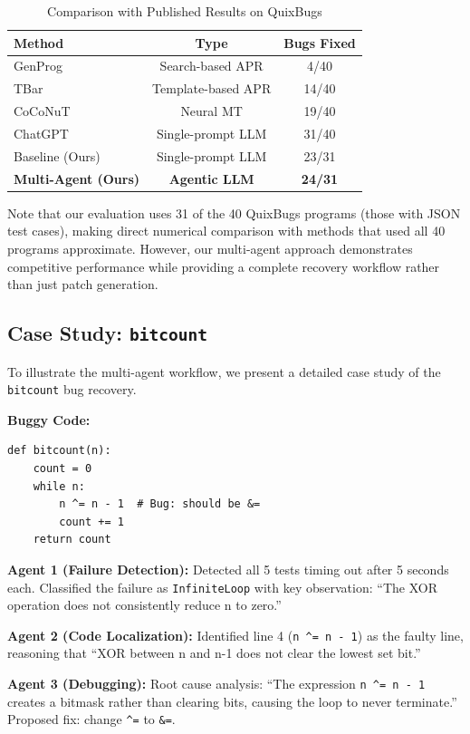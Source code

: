 \documentclass[conference]{IEEEtran}
\begin{document}
\begin{table}[htbp]
\caption{Comparison with Published Results on QuixBugs}
\label{tab:litresults}
\centering
\begin{tabular}{lcc}
\toprule
\textbf{Method} & \textbf{Type} & \textbf{Bugs Fixed} \\
\midrule
GenProg \cite{genprog} & Search-based APR & 4/40 \\
TBar \cite{templateapr} & Template-based APR & 14/40 \\
CoCoNuT \cite{coconut} & Neural MT & 19/40 \\
ChatGPT \cite{chatgptapr} & Single-prompt LLM & 31/40 \\
Baseline (Ours) & Single-prompt LLM & 23/31 \\
\textbf{Multi-Agent (Ours)} & \textbf{Agentic LLM} & \textbf{24/31} \\
\bottomrule
\end{tabular}
\end{table}

Note that our evaluation uses 31 of the 40 QuixBugs programs (those with JSON test cases), making direct numerical comparison with methods that used all 40 programs approximate. However, our multi-agent approach demonstrates competitive performance while providing a complete recovery workflow rather than just patch generation.

\subsection{Case Study: \texttt{bitcount}}
To illustrate the multi-agent workflow, we present a detailed case study of the \texttt{bitcount} bug recovery.

\textbf{Buggy Code:}
\begin{lstlisting}
def bitcount(n):
    count = 0
    while n:
        n ^= n - 1  # Bug: should be &=
        count += 1
    return count
\end{lstlisting}

\textbf{Agent 1 (Failure Detection):} Detected all 5 tests timing out after 5 seconds each. Classified the failure as \texttt{InfiniteLoop} with key observation: ``The XOR operation does not consistently reduce n to zero.''

\textbf{Agent 2 (Code Localization):} Identified line 4 (\texttt{n \^{}= n - 1}) as the faulty line, reasoning that ``XOR between n and n-1 does not clear the lowest set bit.''

\textbf{Agent 3 (Debugging):} Root cause analysis: ``The expression \texttt{n \^{}= n - 1} creates a bitmask rather than clearing bits, causing the loop to never terminate.'' Proposed fix: change \texttt{\^{}=} to \texttt{\&=}.
\end{document}
